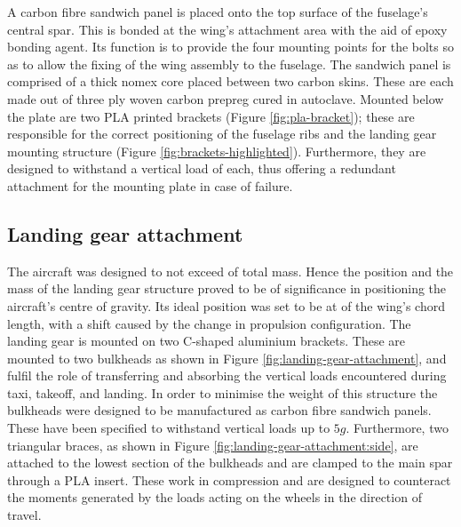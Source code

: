 \documentclass[../../main.tex]{subfiles}
\begin{document}
A carbon fibre sandwich panel is placed onto the top surface of the fuselage's central spar.
This is bonded at the wing's attachment area with the aid of epoxy bonding agent.
Its function is to provide the four mounting points for the bolts so as to allow the fixing of the wing assembly to the fuselage.
The sandwich panel is comprised of a  thick nomex core placed between two carbon skins.
These are each made out of three ply woven carbon prepreg cured in autoclave.
Mounted below the plate are two PLA printed brackets (Figure \ref{fig:pla-bracket}); these are responsible for the correct positioning of the fuselage ribs and the landing gear mounting structure (Figure \ref{fig:brackets-highlighted}).
Furthermore, they are designed to withstand a vertical load of  each, thus offering a redundant attachment for the mounting plate in case of failure.


\subsection{Landing gear attachment} \label{sec:final-design-proposal:fuselage:landing-gear-attachment}

The aircraft was designed to not exceed  of total mass.
Hence the position and the mass of the landing gear structure proved to be of significance in positioning the aircraft's centre of gravity.
Its ideal position was set to be at  of the wing's chord length, with a  shift caused by the change in propulsion configuration.
The landing gear is mounted on two C-shaped  aluminium brackets.
These are mounted to two bulkheads as shown in Figure \ref{fig:landing-gear-attachment}, and fulfil the role of transferring and absorbing the vertical loads encountered during taxi, takeoff, and landing.
In order to minimise the weight of this structure the bulkheads were designed to be manufactured as carbon fibre sandwich panels.
These have been specified to withstand vertical loads up to $5g$.
Furthermore, two triangular braces, as shown in Figure \ref{fig:landing-gear-attachment:side}, are attached to the lowest section of the bulkheads and are clamped to the main spar through a PLA insert.
These work in compression and are designed to counteract the moments generated by the loads acting on the wheels in the direction of travel. 
\end{document}
